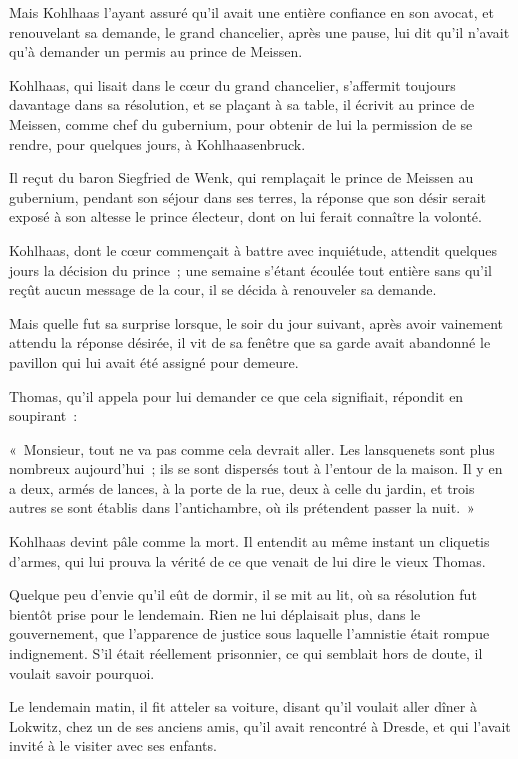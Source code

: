 \documentclass[french,twoside]{book} %
\begin{document}
Mais Kohlhaas l’ayant assuré qu’il avait une entière confiance en son avocat, et renouvelant sa demande, le grand chancelier, après une pause, lui dit qu’il n’avait qu’à demander un permis au prince de Meissen.\par
Kohlhaas, qui lisait dans le cœur du grand chancelier, s’affermit toujours davantage dans sa résolution, et se plaçant à sa table, il écrivit au prince de Meissen, comme chef du gubernium, pour obtenir de lui la permission de se rendre, pour quelques jours, à Kohlhaasenbruck.\par
Il reçut du baron Siegfried de Wenk, qui remplaçait le prince de Meissen au gubernium, pendant son séjour dans ses terres, la réponse que son désir serait exposé à son altesse le prince électeur, dont on lui ferait connaître la volonté.\par
Kohlhaas, dont le cœur commençait à battre avec inquiétude, attendit quelques jours la décision du prince ; une semaine s’étant écoulée tout entière sans qu’il reçût aucun message de la cour, il se décida à renouveler sa demande.\par
Mais quelle fut sa surprise lorsque, le soir du jour suivant, après avoir vainement attendu la réponse désirée, il vit de sa fenêtre que sa garde avait abandonné le pavillon qui lui avait été assigné pour demeure.\par
Thomas, qu’il appela pour lui demander ce que cela signifiait, répondit en soupirant :\par
« Monsieur, tout ne va pas comme cela devrait aller. Les lansquenets sont plus nombreux aujourd’hui ; ils se sont dispersés tout à l’entour de la maison. Il y en a deux, armés de lances, à la porte de la rue, deux à celle du jardin, et trois autres se sont établis dans l’antichambre, où ils prétendent passer la nuit. »\par
Kohlhaas devint pâle comme la mort. Il entendit au même instant un cliquetis d’armes, qui lui prouva la vérité de ce que venait de lui dire le vieux Thomas.\par
Quelque peu d’envie qu’il eût de dormir, il se mit au lit, où sa résolution fut bientôt prise pour le lendemain. Rien ne lui déplaisait plus, dans le gouvernement, que l’apparence de justice sous laquelle l’amnistie était rompue indignement. S’il était réellement prisonnier, ce qui semblait hors de doute, il voulait savoir pourquoi.\par
Le lendemain matin, il fit atteler sa voiture, disant qu’il voulait aller dîner à Lokwitz, chez un de ses anciens amis, qu’il avait rencontré à Dresde, et qui l’avait invité à le visiter avec ses enfants.\par
\end{document}
